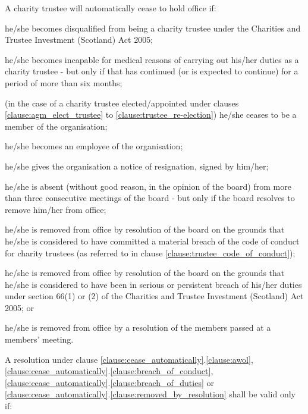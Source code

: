﻿\documentclass[a4paper,11pt,onecolumn ]{article}
\begin{document}

\begin{legal}
\item \label{clause:cease_automatically} A charity trustee will automatically cease to hold office if:
    \begin{legal}
        \item he/she becomes disqualified from being a charity trustee under the Charities and Trustee Investment (Scotland) Act 2005;
        \item he/she becomes incapable for medical reasons of carrying out his/her duties as a charity trustee - but only if that has continued (or is expected to continue) for a period of more than six months;
        \item (in the case of a charity trustee elected/appointed under clauses \ref{clause:agm_elect_trustee} to \ref{clause:trustee_re-election}) he/she ceases to be a member of the organisation;
        \item he/she becomes an employee of the organisation;
        \item he/she gives the organisation a notice of resignation, signed by him/her;
        \item \label{clause:awol} he/she is absent (without good reason, in the opinion of the board) from more than three consecutive meetings of the board - but only if the board resolves to remove him/her from office;
        \item \label{clause:breach_of_conduct} he/she is removed from office by resolution of the board on the grounds that he/she is considered to have committed a material breach of the code of conduct for charity trustees (as referred to in clause \ref{clause:trustee_code_of_conduct});
        \item \label{clause:breach_of_duties} he/she is removed from office by resolution of the board on the grounds that he/she is considered to have been in serious or persistent  breach of his/her duties under section 66(1) or (2) of the Charities and Trustee Investment (Scotland) Act 2005; or
        \item \label{clause:removed_by_resolution} he/she is removed from office by a resolution of the members passed at a members’ meeting.
    \end{legal}
\item A resolution under clause \ref{clause:cease_automatically}.\ref{clause:awol}, \ref{clause:cease_automatically}.\ref{clause:breach_of_conduct}, \ref{clause:cease_automatically}.\ref{clause:breach_of_duties} or \ref{clause:cease_automatically}.\ref{clause:removed_by_resolution} shall be valid only if:

\end{legal}
\end{document}
